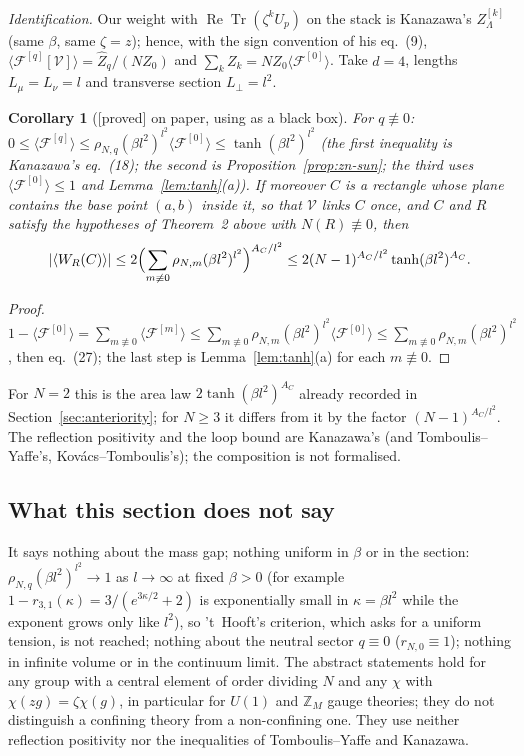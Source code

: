\documentclass[11pt,a4paper]{article}
\theoremstyle{plain}
\newtheorem{corollary}[theorem]{Corollary}
\theoremstyle{definition}
\theoremstyle{remark}
\numberwithin{equation}{section}
\newcommand{\st}[1]{\textsf{[#1]}}
\begin{document}
\emph{Identification.} Our weight with $\operatorname{Re}\operatorname{Tr}(\zeta^kU_p)$ on the stack is Kanazawa's $Z^{[k]}_\Lambda$ (same $\beta$, same $\zeta=z$); hence, with the sign convention of his eq.~(9), $\langle\mathcal F^{[q]}[\mathcal V]\rangle=\hat Z_q/(NZ_0)$ and $\sum_k Z_k=NZ_0\langle\mathcal F^{[0]}\rangle$. Take $d=4$, lengths $L_\mu=L_\nu=l$ and transverse section $L_\perp=l^2$.
\begin{corollary}[\st{proved} on paper, using \cite{Kan} as a black box]\label{cor:zn-kan}
For $q\not\equiv0$: $0\le\langle\mathcal F^{[q]}\rangle\le\rho_{N,q}(\beta l^2)^{l^2}\langle\mathcal F^{[0]}\rangle\le\tanh(\beta l^2)^{l^2}$ (the first inequality is Kanazawa's eq.~(18); the second is Proposition~\ref{prop:zn-sun}; the third uses $\langle\mathcal F^{[0]}\rangle\le1$ and Lemma~\ref{lem:tanh}(a)). If moreover $C$ is a rectangle whose plane contains the base point $(a,b)$ inside it, so that $\mathcal V$ links $C$ once, and $C$ and $R$ satisfy the hypotheses of Theorem~2 above with $N(R)\not\equiv0$, then
\[
|\langle W_R(C)\rangle|\le2\Bigl(\sum_{m\not\equiv0}\rho_{N,m}(\beta l^2)^{l^2}\Bigr)^{A_C/l^2}\le2(N-1)^{A_C/l^2}\tanh(\beta l^2)^{A_C}.
\]
\end{corollary}
\begin{proof}
$1-\langle\mathcal F^{[0]}\rangle=\sum_{m\not\equiv0}\langle\mathcal F^{[m]}\rangle\le\sum_{m\not\equiv0}\rho_{N,m}(\beta l^2)^{l^2}\langle\mathcal F^{[0]}\rangle\le\sum_{m\not\equiv0}\rho_{N,m}(\beta l^2)^{l^2}$, then eq.~(27); the last step is Lemma~\ref{lem:tanh}(a) for each $m\not\equiv0$.
\end{proof}
For $N=2$ this is the area law $2\tanh(\beta l^2)^{A_C}$ already recorded in Section~\ref{sec:anteriority}; for $N\ge3$ it differs from it by the factor $(N-1)^{A_C/l^2}$. The reflection positivity and the loop bound are Kanazawa's (and Tomboulis--Yaffe's, Kov\'acs--Tomboulis's); the composition is not formalised.

\subsection{What this section does not say}\label{sec:zn-not}
It says nothing about the mass gap; nothing uniform in $\beta$ or in the section: $\rho_{N,q}(\beta l^2)^{l^2}\to1$ as $l\to\infty$ at fixed $\beta>0$ (for example $1-r_{3,1}(\kappa)=3/(e^{3\kappa/2}+2)$ is exponentially small in $\kappa=\beta l^2$ while the exponent grows only like $l^2$), so 't~Hooft's criterion, which asks for a uniform tension, is not reached; nothing about the neutral sector $q\equiv0$ ($r_{N,0}\equiv1$); nothing in infinite volume or in the continuum limit. The abstract statements hold for any group with a central element of order dividing $N$ and any $\chi$ with $\chi(zg)=\zeta\chi(g)$, in particular for $U(1)$ and $\mathbb Z_M$ gauge theories; they do not distinguish a confining theory from a non-confining one. They use neither reflection positivity nor the inequalities of Tomboulis--Yaffe and Kanazawa.
\end{document}
